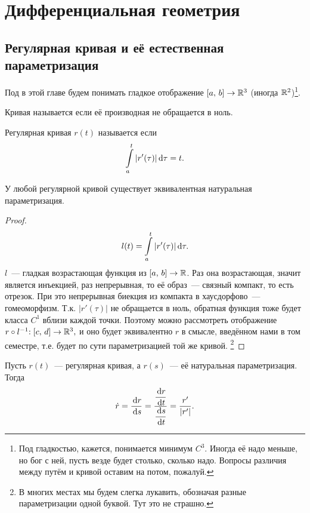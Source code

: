\documentclass{notes}
\begin{document}
\chapter{Дифференциальная геометрия}

\section{Регулярная кривая и её естественная параметризация}
	
	\begin{de}
		Под  в этой главе будем понимать гладкое отображение $[a, \, b] \to \mathbb{R}^3$ (иногда $\mathbb{R}^2$)\footnote{Под гладкостью, кажется, понимается минимум $C^3$. Иногда её надо меньше, но бог с ней, пусть везде будет столько, сколько надо. Вопросы различия между путём и кривой оставим на потом, пожалуй.}.
	\end{de}

	\begin{de}
		Кривая называется  если её производная не обращается в ноль. 
	\end{de}

	\begin{de}
		Регулярная кривая $r(t)$ называется  если
		\[
			\int\limits_a^t |r'(\tau)| \, \mathrm{d} \tau = t.
		\]
	\end{de}

	\begin{st}
		У любой регулярной кривой существует эквивалентная натуральная параметризация.
		\begin{proof}
			\[
				l(t) = \int\limits_{a}^{t} |r'(\tau)| \, \mathrm{d} \tau.
			\] 
			$l$~--- гладкая возрастающая функция из $[a, \, b] \to \mathbb{R}$. Раз она возрастающая, значит является инъекцией, раз непрерывная, то её образ~--- связный компакт, то есть отрезок. При это непрерывная биекция из компакта в хаусдорфово~--- гомеоморфизм. Т.к. $|r'(\tau)|$ не обращается в ноль, обратная функция тоже будет класса $C^{1}$ вблизи каждой точки. Поэтому можно рассмотреть отображение $r \circ l^{-1} \text{\text{:}} \; [c, \, d] \to \mathbb{R}^3,$ и оно будет эквивалентно $r$ в смысле, введённом нами в том семестре, т.е. будет по сути параметризацией той же кривой. \footnote{В многих местах мы будем слегка лукавить, обозначая разные параметризации одной буквой. Тут это не страшно.}
		\end{proof}
	\end{st}

	\begin{st}
		Пусть $r(t)$~--- регулярная кривая, а $r(s)$~--- её натуральная параметризация. Тогда
		\[
			\dot{r} = \dfrac{\, \mathrm{d} r}{\, \mathrm{d} s} = \dfrac{\dfrac{\, \mathrm{d} r}{\, \mathrm{d} t}}{\dfrac{\, \mathrm{d} s}{\, \mathrm{d} t}} = \dfrac{r'}{|r'|}.
		\]
	\end{st}
\end{document}
